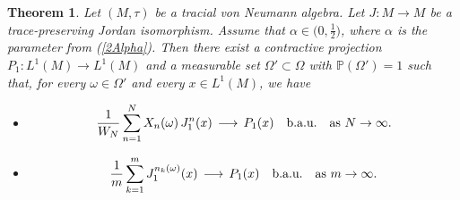 \documentclass[12pt]{amsart}
\newcommand{\Pdb}{\mbox{$\mathbb{P}$}}
\newtheorem{theorem}{Theorem}[section]
\theoremstyle{remark}
\theoremstyle{definition}
\numberwithin{equation}{section}
\begin{document}
\begin{theorem}\label{5Main}
Let $(M,\tau)$ be a tracial von Neumann algebra.
Let $J\colon M\to M$ be a trace-preserving Jordan 
isomorphism. Assume that $\alpha\in\bigl(0,\frac12\bigr)$, where $\alpha$ is the parameter from (\ref{2Alpha}). Then there exist a contractive projection
$P_1\colon L^1(M)\to L^1(M)$ and a measurable set
$\Omega'\subset\Omega$ with $\Pdb(\Omega')=1$ such that, for every
$\omega\in\Omega'$ and every $x\in L^1(M)$, we have
\begin{itemize}
\item[(1)]
$$
\frac{1}{W_N}\sum_{n=1}^N X_n(\omega)\,J_1^n(x)
\,\longrightarrow\,P_1(x)\quad\hbox{b.a.u.}
\quad\hbox{as }N\to\infty.
$$

\item[(2)]
$$
\frac{1}{m}\sum_{k=1}^m J_1^{n_k(\omega)}(x)
\,\longrightarrow\,P_1(x)\quad\hbox{b.a.u.}
\quad\hbox{as }m\to\infty.
$$
\end{itemize}
\end{theorem}
\end{document}
